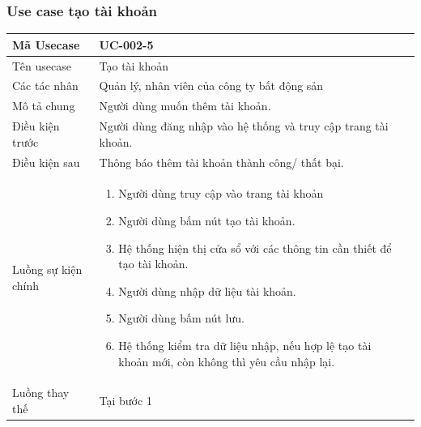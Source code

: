 \documentclass[12pt,a4paper]{article}
\begin{document}
    \subsubsection*{Use case tạo tài khoản }
    \begin{table}[H]
        \centering
        \begin{tabular}{|p{3.5cm}|p{11.5cm}|c|}
            \hline
            Mã Usecase      & UC-002-5                                                       \\
            \hline
            Tên usecase     & Tạo tài khoản                                                  \\
            \hline
            Các tác nhân    & Quản lý, nhân viên của công ty bất động sản                    \\
            \hline
            Mô tả chung     & Người dùng muốn thêm tài khoản.                                \\
            \hline
            Điều kiện trước & Người dùng đăng nhập vào hệ thống và truy cập trang tài khoản. \\
            \hline
            Điều kiện sau   & Thông báo thêm tài khoản thành công/ thất bại.                 \\
            \hline
            Luồng sự kiện chính & \vspace{-.8cm}\begin{enumerate}
                                                    \item Người dùng truy cập vào trang tài khoản
                                                    \item  Người dùng bấm nút tạo tài khoản.
                                                    \item  Hệ thống hiện thị cửa sổ với các thông tin cần thiết để tạo tài khoản.
                                                    \item  Người dùng nhập dữ liệu tài khoản.
                                                    \item Người dùng bấm nút lưu.
                                                    \item Hệ thống kiểm tra dữ liệu nhập, nếu hợp lệ tạo tài khoản mới, còn không thì yêu cầu nhập lại.
            \end{enumerate}
            \\
            \hline
            Luồng thay thế & Tại bước 1\newline

\end{tabular}
\end{table}
\end{document}
